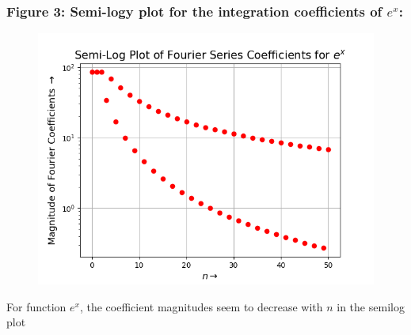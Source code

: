 \documentclass[12pt, a4paper]{article}
\begin{document}
\subsubsection{Figure 3: Semi-logy plot for the integration coefficients of $e^{x}$:}
\vspace*{-0.5cm}
\begin{figure}[H]
        \centering
        \includegraphics[scale = 0.75]{Figure_3.png}
        \label{fig:sample}
    \end{figure}
\vspace*{-0.5cm}
    \begin{center}
        For function $e^{x}$, the coefficient magnitudes seem to decrease with $n$ in the semilog plot
    \end{center}
\end{document}
